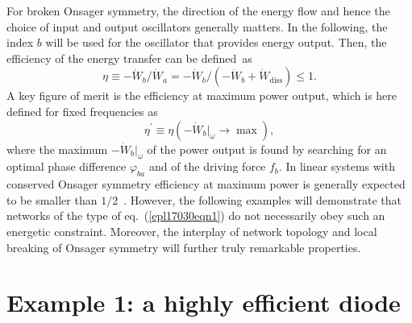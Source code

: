\documentclass[doublecol,final,edchoice]{epl2}
\begin{document}
For broken Onsager symmetry, the direction of the energy flow and hence the choice of input and output oscillators generally matters. In the following, the index $b$ will be used for the oscillator that provides energy output. Then, the efficiency of the energy transfer can be defined~as
\begin{equation}%
\eta \equiv -\dot{W}_b/\dot{W}_a = -\dot{W}_b/(-\dot{W}_b + \dot{W}_{\text{diss}}) \leq 1.
\label{epl17030eqn8}
\end{equation}
A key figure of merit is the efficiency at maximum power output, which is here defined for fixed frequencies as
\begin{equation}%
\eta^{\prime} \equiv \eta(-\dot{W}_b |_{{\omega}} \rightarrow \max),
\label{epl17030eqn9}
\end{equation}
where the maximum $-\dot{W}_b |_{{\omega}} $ of the power output is found by searching for an optimal phase difference $\varphi_{ba}$ and  of the driving force $f_b$. In linear systems with conserved Onsager symmetry efficiency at maximum power is generally expected to be smaller than $1/2$~\cite{epl17030bib16}. However, the following examples will demonstrate that networks of the type of eq.~(\ref{epl17030eqn1}) do not necessarily obey such an energetic constraint. Moreover, the interplay of network topology and local breaking of Onsager symmetry will  further truly remarkable properties.

\section{Example 1: a highly efficient diode}
\end{document}
